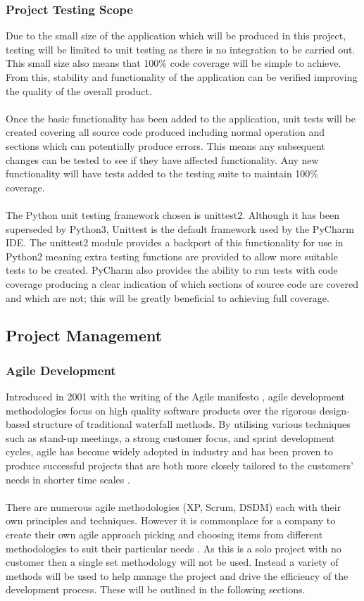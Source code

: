 	\subsubsection{Project Testing Scope}\label{sec:project_testing_scope}
		Due to the small size of the application which will be produced in this project, testing will be limited to unit testing as there is no integration to be carried out. This small size also means that 100\% code coverage will be simple to achieve. From this, stability and functionality of the application can be verified improving the quality of the overall product.
		\\\\
		Once the basic functionality has been added to the application, unit tests will be created covering all source code produced including normal operation and sections which can potentially produce errors. This means any subsequent changes  can be tested to see if they have affected functionality. Any new functionality will have tests added to the testing suite to maintain 100\% coverage.
		\\\\
		The Python unit testing framework chosen is unittest2. Although it has been superseded by Python3, Unittest is the default framework used by the PyCharm IDE. The unittest2 module provides a backport of this functionality for use in Python2 meaning extra testing functions are provided to allow more suitable tests to be created. PyCharm also provides the ability to run tests with code coverage producing a clear indication of which sections of source code are covered and which are not; this will be greatly beneficial to achieving  full coverage.
\subsection{Project Management}\label{sec:project_management}
	\subsubsection{Agile Development}
		Introduced in 2001 with the writing of the Agile manifesto \citep{beck2001manifesto}, agile development methodologies focus on high quality software products over the rigorous design-based structure of traditional waterfall methods. By utilising various techniques such as stand-up meetings, a strong customer focus, and sprint development cycles, agile has become widely adopted in industry and has been proven to produce successful projects that are both more closely tailored to the customers’ needs in shorter time scales \citep{state_of_agile_2015}.
		\\\\
		There are numerous agile methodologies (XP, Scrum, DSDM) each  with their own principles and techniques. However it is commonplace for a company to create their own agile approach  picking and choosing  items from different methodologies to suit their particular  needs . As this is a solo project with no customer then a single  set methodology will not be used. Instead a variety of methods will be used to  help  manage the project and drive the efficiency of the development process. These will be outlined in the following sections.
